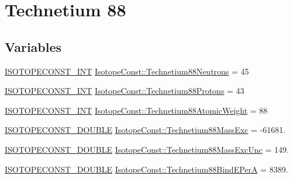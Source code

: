 \hypertarget{group___isotope_const-_technetium-_tc88}{}\section{Technetium 88}
\label{group___isotope_const-_technetium-_tc88}
\subsection*{Variables}
\begin{DoxyCompactItemize}
\item 
\mbox{\hyperlink{group___isotope_const-_macros_ga5f18360b3e99483a35c32d789e62621c}{I\+S\+O\+T\+O\+P\+E\+C\+O\+N\+S\+T\+\_\+\+I\+NT}} \mbox{\hyperlink{group___isotope_const-_technetium-_tc88_gac2e1a11afc7b1c0c22286889155153a1}{Isotope\+Const\+::\+Technetium88\+Neutrons}} = 45
\item 
\mbox{\hyperlink{group___isotope_const-_macros_ga5f18360b3e99483a35c32d789e62621c}{I\+S\+O\+T\+O\+P\+E\+C\+O\+N\+S\+T\+\_\+\+I\+NT}} \mbox{\hyperlink{group___isotope_const-_technetium-_tc88_gafb06be1e7e7d25a4d35245c4821d807a}{Isotope\+Const\+::\+Technetium88\+Protons}} = 43
\item 
\mbox{\hyperlink{group___isotope_const-_macros_ga5f18360b3e99483a35c32d789e62621c}{I\+S\+O\+T\+O\+P\+E\+C\+O\+N\+S\+T\+\_\+\+I\+NT}} \mbox{\hyperlink{group___isotope_const-_technetium-_tc88_gaa501fe39acf3d2b5478677bab70f4260}{Isotope\+Const\+::\+Technetium88\+Atomic\+Weight}} = 88
\item 
\mbox{\hyperlink{group___isotope_const-_macros_ga8f45a7272ce02c0b4c65c44636ed719a}{I\+S\+O\+T\+O\+P\+E\+C\+O\+N\+S\+T\+\_\+\+D\+O\+U\+B\+LE}} \mbox{\hyperlink{group___isotope_const-_technetium-_tc88_ga3181d47ac3bfe57932262233f5f0ad3d}{Isotope\+Const\+::\+Technetium88\+Mass\+Exc}} = -\/61681.
\item 
\mbox{\hyperlink{group___isotope_const-_macros_ga8f45a7272ce02c0b4c65c44636ed719a}{I\+S\+O\+T\+O\+P\+E\+C\+O\+N\+S\+T\+\_\+\+D\+O\+U\+B\+LE}} \mbox{\hyperlink{group___isotope_const-_technetium-_tc88_ga4f8799d7c91aa7e00f81dbb7ddf457d1}{Isotope\+Const\+::\+Technetium88\+Mass\+Exc\+Unc}} = 149.
\item 
\mbox{\hyperlink{group___isotope_const-_macros_ga8f45a7272ce02c0b4c65c44636ed719a}{I\+S\+O\+T\+O\+P\+E\+C\+O\+N\+S\+T\+\_\+\+D\+O\+U\+B\+LE}} \mbox{\hyperlink{group___isotope_const-_technetium-_tc88_ga75c633887fc3bc702845645bc197b4ed}{Isotope\+Const\+::\+Technetium88\+Bind\+E\+PerA}} = 8389.
\item 

\end{DoxyCompactItemize}
